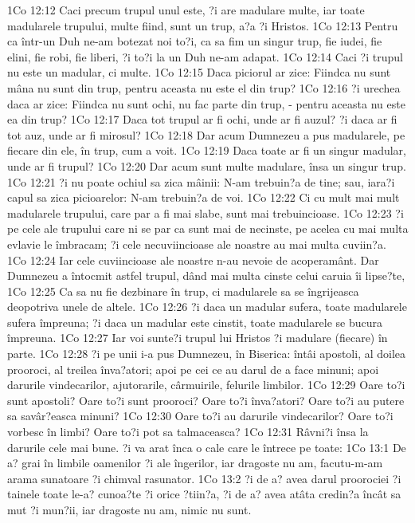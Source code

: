 1Co 12:12  Caci precum trupul unul este, ?i are madulare multe, iar toate madularele trupului, multe fiind, sunt un trup, a?a ?i Hristos.
1Co 12:13  Pentru ca într-un Duh ne-am botezat noi to?i, ca sa fim un singur trup, fie iudei, fie elini, fie robi, fie liberi, ?i to?i la un Duh ne-am adapat.
1Co 12:14  Caci ?i trupul nu este un madular, ci multe.
1Co 12:15  Daca piciorul ar zice: Fiindca nu sunt mâna nu sunt din trup, pentru aceasta nu este el din trup?
1Co 12:16  ?i urechea daca ar zice: Fiindca nu sunt ochi, nu fac parte din trup, - pentru aceasta nu este ea din trup?
1Co 12:17  Daca tot trupul ar fi ochi, unde ar fi auzul? ?i daca ar fi tot auz, unde ar fi mirosul?
1Co 12:18  Dar acum Dumnezeu a pus madularele, pe fiecare din ele, în trup, cum a voit.
1Co 12:19  Daca toate ar fi un singur madular, unde ar fi trupul?
1Co 12:20  Dar acum sunt multe madulare, însa un singur trup.
1Co 12:21  ?i nu poate ochiul sa zica mâinii: N-am trebuin?a de tine; sau, iara?i capul sa zica picioarelor: N-am trebuin?a de voi.
1Co 12:22  Ci cu mult mai mult madularele trupului, care par a fi mai slabe, sunt mai trebuincioase.
1Co 12:23  ?i pe cele ale trupului care ni se par ca sunt mai de necinste, pe acelea cu mai multa evlavie le îmbracam; ?i cele necuviincioase ale noastre au mai multa cuviin?a.
1Co 12:24  Iar cele cuviincioase ale noastre n-au nevoie de acoperamânt. Dar Dumnezeu a întocmit astfel trupul, dând mai multa cinste celui caruia îi lipse?te,
1Co 12:25  Ca sa nu fie dezbinare în trup, ci madularele sa se îngrijeasca deopotriva unele de altele.
1Co 12:26  ?i daca un madular sufera, toate madularele sufera împreuna; ?i daca un madular este cinstit, toate madularele se bucura împreuna.
1Co 12:27  Iar voi sunte?i trupul lui Hristos ?i madulare (fiecare) în parte.
1Co 12:28  ?i pe unii i-a pus Dumnezeu, în Biserica: întâi apostoli, al doilea prooroci, al treilea înva?atori; apoi pe cei ce au darul de a face minuni; apoi darurile vindecarilor, ajutorarile, cârmuirile, felurile limbilor.
1Co 12:29  Oare to?i sunt apostoli? Oare to?i sunt prooroci? Oare to?i înva?atori? Oare to?i au putere sa savâr?easca minuni?
1Co 12:30  Oare to?i au darurile vindecarilor? Oare to?i vorbesc în limbi? Oare to?i pot sa talmaceasca?
1Co 12:31  Râvni?i însa la darurile cele mai bune. ?i va arat înca o cale care le întrece pe toate:
1Co 13:1  De a? grai în limbile oamenilor ?i ale îngerilor, iar dragoste nu am, facutu-m-am arama sunatoare ?i chimval rasunator.
1Co 13:2  ?i de a? avea darul proorociei ?i tainele toate le-a? cunoa?te ?i orice ?tiin?a, ?i de a? avea atâta credin?a încât sa mut ?i mun?ii, iar dragoste nu am, nimic nu sunt.
